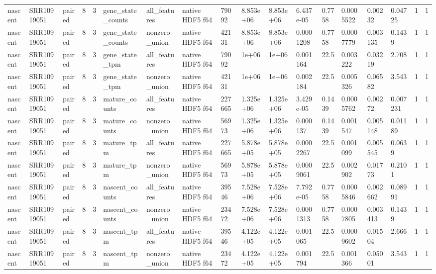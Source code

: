 \begin{tabular}{llllllllllllllllll}
nascent & SRR10919051 & paired & 8 & 3 & gene\_state\_counts & all\_features & native HDF5 f64 & 79092 & 8.853e+06 & 8.853e+06 & 6.437e-05 & 0.7758 & 0.0005522 & 0.00232 & 0.04725 & 1 & 1 \\
nascent & SRR10919051 & paired & 8 & 3 & gene\_state\_counts & nonzero\_union & native HDF5 f64 & 42131 & 8.853e+06 & 8.853e+06 & 0.0001208 & 0.7758 & 0.0007779 & 0.003135 & 0.1439 & 1 & 1 \\
nascent & SRR10919051 & paired & 8 & 3 & gene\_state\_tpm & all\_features & native HDF5 f64 & 79092 & 1e+06 & 1e+06 & 0.001164 & 22.5 & 0.003222 & 0.03219 & 2.708 & 1 & 1 \\
nascent & SRR10919051 & paired & 8 & 3 & gene\_state\_tpm & nonzero\_union & native HDF5 f64 & 42131 & 1e+06 & 1e+06 & 0.002184 & 22.5 & 0.005326 & 0.06582 & 3.543 & 1 & 1 \\
nascent & SRR10919051 & paired & 8 & 3 & mature\_counts & all\_features & native HDF5 f64 & 227665 & 1.325e+06 & 1.325e+06 & 3.429e-05 & 0.1439 & 0.0005762 & 0.00272 & 0.007231 & 1 & 1 \\
nascent & SRR10919051 & paired & 8 & 3 & mature\_counts & nonzero\_union & native HDF5 f64 & 56973 & 1.325e+06 & 1.325e+06 & 0.000137 & 0.1439 & 0.001547 & 0.005148 & 0.01189 & 1 & 1 \\
nascent & SRR10919051 & paired & 8 & 3 & mature\_tpm & all\_features & native HDF5 f64 & 227665 & 5.878e+05 & 5.878e+05 & 0.0002267 & 22.5 & 0.001099 & 0.005545 & 0.0639 & 1 & 1 \\
nascent & SRR10919051 & paired & 8 & 3 & mature\_tpm & nonzero\_union & native HDF5 f64 & 56973 & 5.878e+05 & 5.878e+05 & 0.0009061 & 22.5 & 0.002902 & 0.01773 & 0.2101 & 1 & 1 \\
nascent & SRR10919051 & paired & 8 & 3 & nascent\_counts & all\_features & native HDF5 f64 & 39546 & 7.528e+06 & 7.528e+06 & 7.792e-05 & 0.7758 & 0.0005846 & 0.002662 & 0.08991 & 1 & 1 \\
nascent & SRR10919051 & paired & 8 & 3 & nascent\_counts & nonzero\_union & native HDF5 f64 & 23472 & 7.528e+06 & 7.528e+06 & 0.0001313 & 0.7758 & 0.0007805 & 0.003413 & 0.1439 & 1 & 1 \\
nascent & SRR10919051 & paired & 8 & 3 & nascent\_tpm & all\_features & native HDF5 f64 & 39546 & 4.122e+05 & 4.122e+05 & 0.001065 & 22.5 & 0.0009602 & 0.01504 & 2.666 & 1 & 1 \\
nascent & SRR10919051 & paired & 8 & 3 & nascent\_tpm & nonzero\_union & native HDF5 f64 & 23472 & 4.122e+05 & 4.122e+05 & 0.001794 & 22.5 & 0.001366 & 0.05001 & 3.543 & 1 & 1 \\

\end{tabular}
